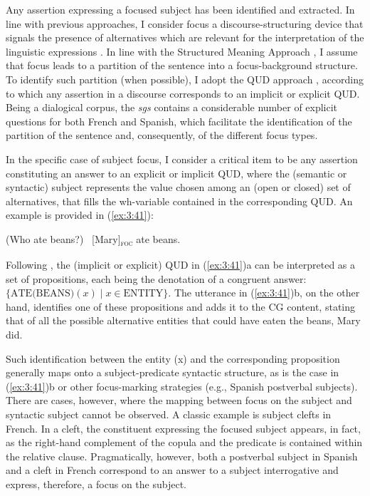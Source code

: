 Any assertion expressing a focused subject has been identified and extracted. In line with previous approaches, I consider focus a discourse-structuring device that signals the presence of alternatives which are relevant for the interpretation of the linguistic expressions \parencite{rooth1992theory, krifka2008basic}. In line with the Structured Meaning Approach \parencite{von1982structured, von1990current, jacobs2012fokus, krifka1991compositional, krifka2008basic}, I assume that focus leads to a partition of the sentence into a focus-background structure. To identify such partition (when possible), I adopt the QUD approach \parencite{roberts1996information, velleman2016question, riester2018annotation}, according to which any assertion in a discourse corresponds to an implicit or explicit QUD. Being a dialogical corpus, the \textit{sgs} contains a considerable number of explicit questions for both French and Spanish, which facilitate the identification of the partition of the sentence and, consequently, of the different focus types.

In the specific case of subject focus, I consider a critical item to be any assertion constituting an answer to an explicit or implicit QUD, where the (semantic or syntactic) subject represents the value chosen among an (open or closed) set of alternatives, that fills the wh-variable contained in the corresponding QUD. An example is provided in (\ref{ex:3:41}):


\ea \label{ex:3:41}
\ea (Who ate beans?)
\ex \ [Mary]\textsubscript{\textsc{foc}} \normalsize ate beans. \hfill \parencite[7]{velleman2016question}
\z \z


Following \textcite{hamblin1976questions}, the (implicit or explicit) QUD in (\ref{ex:3:41})a can be interpreted as a set of propositions, each being the denotation of a congruent answer: \( \{ \text{ATE(BEANS)}(x) \mid x \in \text{ENTITY} \} \). The utterance in (\ref{ex:3:41})b, on the other hand,  identifies one of these propositions and adds it to the CG content, stating that of all the possible alternative entities that could have eaten the beans, Mary did. 

Such identification between the entity (x) and the corresponding proposition generally maps onto a subject-predicate syntactic structure, as is the case in (\ref{ex:3:41})b or other focus-marking strategies  (e.g., Spanish postverbal subjects). There are cases, however, where the mapping between focus on the subject and syntactic subject cannot be observed. A classic example is subject clefts in French. In a cleft, the constituent expressing the focused subject appears, in fact, as the right-hand complement of the copula and the predicate is contained within the relative clause. Pragmatically, however, both a postverbal subject in Spanish and a cleft in French correspond to an answer to a subject interrogative and express, therefore, a focus on the subject. 

